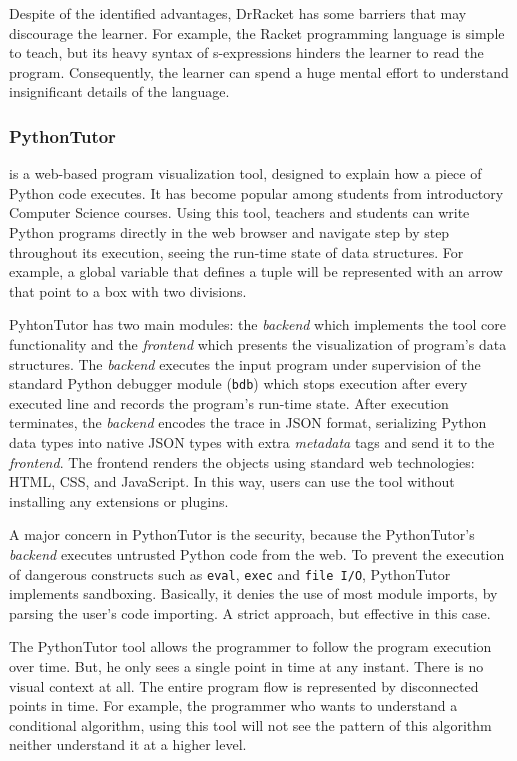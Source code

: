 Despite of the identified advantages, DrRacket has some barriers that may discourage the learner. For example, the Racket programming language is simple to teach, but its heavy syntax of s-expressions hinders the learner to read the program. Consequently, the learner can spend a huge mental effort to understand insignificant details of the language.
\subsubsection{PythonTutor~\cite{GuoSIGCSE2013}} is a web-based program visualization tool, designed to explain how a piece of Python code executes. It has become popular among students from introductory Computer Science courses. Using this tool, teachers and students can write Python programs directly in the web browser and navigate step by step throughout its execution, seeing the run-time state of data structures. For example, a global variable that defines a tuple will be represented with an arrow that point to a box with two divisions.

PyhtonTutor has two main modules: the \textit{backend} which implements the tool core functionality and the \textit{frontend} which presents the visualization of program's data structures. The \textit{backend} executes the input program under supervision of the standard Python debugger module (\texttt{bdb}) which stops execution after every executed line and records the program's run-time state. After execution terminates, the \textit{backend} encodes the trace in JSON format, serializing Python data types into native JSON types with extra \textit{metadata} tags and send it to the \textit{frontend}. The frontend renders the objects using standard web technologies: HTML, CSS, and JavaScript. In this way, users can use the tool without installing any extensions or plugins.

A major concern in PythonTutor is the security, because the PythonTutor's \textit{backend} executes untrusted Python code from the web. To prevent the execution of dangerous constructs such as {\tt eval}, {\tt exec} and {\tt file I/O}, PythonTutor implements sandboxing. Basically, it denies the use of most module imports, by parsing the user's code importing. A strict approach, but effective in this case.

The PythonTutor tool allows the programmer to follow the program execution over time. But, he only sees a single point in time at any instant. There is no visual context at all. The entire program flow is represented by disconnected points in time. For example, the programmer who wants to understand a conditional algorithm, using this tool will not see the pattern of this algorithm neither understand it at a higher level.
